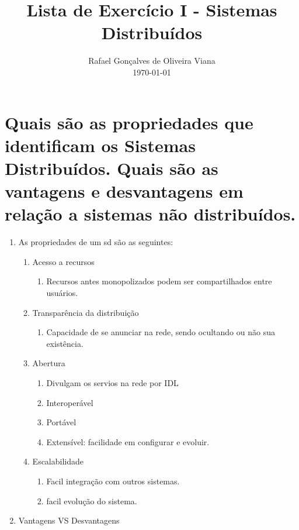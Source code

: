 \documentclass[12pt]{article}
\title{ Lista de Exercício I - Sistemas Distribuídos}
\author{Rafael Gonçalves de Oliveira Viana\inst{1} \\\vspace*{10pt} \normalsize  \today{} }
\begin{document}
 

\maketitle

     



\section{Quais são as propriedades que identificam os Sistemas Distribuídos. Quais são as
	vantagens e desvantagens em relação a sistemas não distribuídos.}
	\begin{enumerate}
		\item As propriedades de um sd são as seguintes:
		\begin{enumerate}
		\item Acesso a recursos	
			\begin{enumerate}
				\item Recursos antes monopolizados podem ser compartilhados entre usuários.
			\end{enumerate}
		\item Transparência da distribuição
			\begin{enumerate}
				\item Capacidade de se anunciar na rede, sendo ocultando ou não sua existência. 
			\end{enumerate}
		\item Abertura
			\begin{enumerate}
				\item Divulgam os servios na rede por IDL
				\item Interoperável
				\item Portável
				\item Extensível: facilidade em configurar e evoluir.
			\end{enumerate}
		\item Escalabilidade
			\begin{enumerate}
				\item Facil integração com outros sistemas.
				\item facil evolução do sistema.
			\end{enumerate}
		\end{enumerate}
		\item Vantagens VS Desvantagens
		\begin{enumerate}

\end{enumerate}
\end{enumerate}
\end{document}
